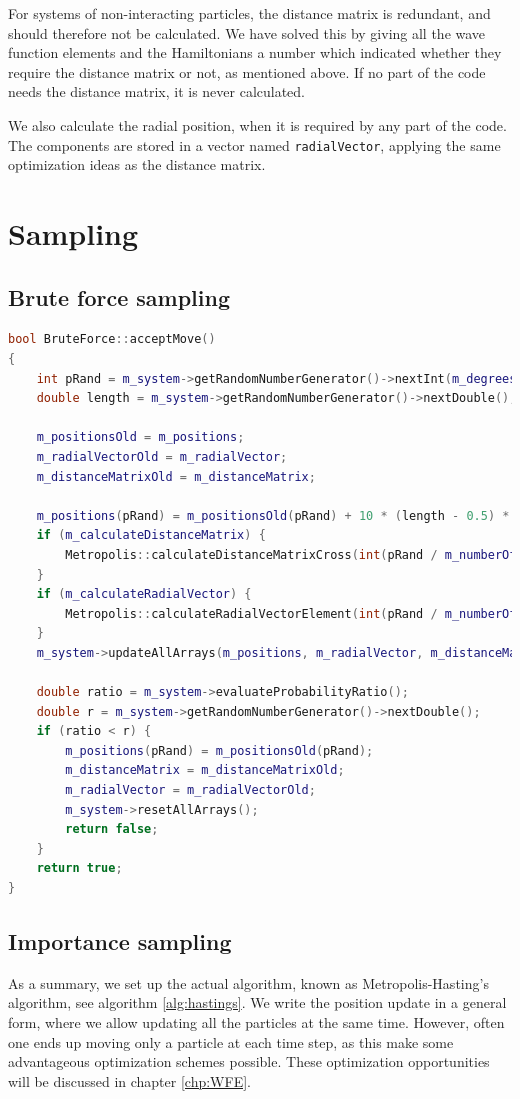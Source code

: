 For systems of non-interacting particles, the distance matrix is redundant, and should therefore not be calculated. We have solved this by giving all the wave function elements and the Hamiltonians a number which indicated whether they require the distance matrix or not, as mentioned above. If no part of the code needs the distance matrix, it is never calculated. 

We also calculate the radial position, when it is required by any part of the code. The components are stored in a vector named \lstinline{radialVector}, applying the same optimization ideas as the distance matrix. 

\section{Sampling} \label{sec:sampling}
\subsection{Brute force sampling}
\begin{lstlisting}[language=c++,caption={Taken from \lstinline{bruteforce.cpp}.}]
bool BruteForce::acceptMove()
{
	int pRand = m_system->getRandomNumberGenerator()->nextInt(m_degreesOfFreedom);
	double length = m_system->getRandomNumberGenerator()->nextDouble();

	m_positionsOld = m_positions;
	m_radialVectorOld = m_radialVector;
	m_distanceMatrixOld = m_distanceMatrix;

	m_positions(pRand) = m_positionsOld(pRand) + 10 * (length - 0.5) * m_stepLength;
	if (m_calculateDistanceMatrix) {
		Metropolis::calculateDistanceMatrixCross(int(pRand / m_numberOfDimensions));
	}
	if (m_calculateRadialVector) {
		Metropolis::calculateRadialVectorElement(int(pRand / m_numberOfDimensions));
	}
	m_system->updateAllArrays(m_positions, m_radialVector, m_distanceMatrix, pRand);

	double ratio = m_system->evaluateProbabilityRatio();
	double r = m_system->getRandomNumberGenerator()->nextDouble();
	if (ratio < r) {
		m_positions(pRand) = m_positionsOld(pRand);
		m_distanceMatrix = m_distanceMatrixOld;
		m_radialVector = m_radialVectorOld;
		m_system->resetAllArrays();
		return false;
	}
	return true;
}
\end{lstlisting}

\subsection{Importance sampling}
As a summary, we set up the actual algorithm, known as Metropolis-Hasting's algorithm, see algorithm \eqref{alg:hastings}. We write the position update in a general form, where we allow updating all the particles at the same time. However, often one ends up moving only a particle at each time step, as this make some advantageous optimization schemes possible. These optimization opportunities will be discussed in chapter \ref{chp:WFE}.


